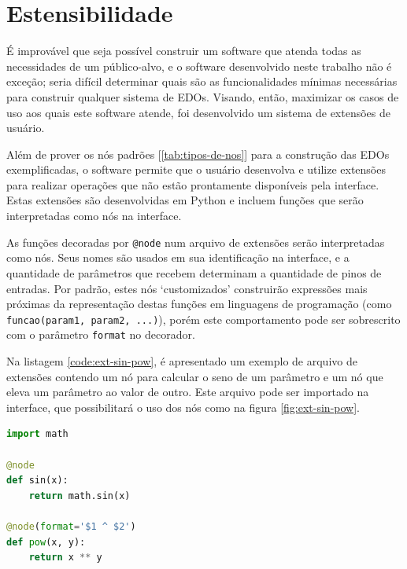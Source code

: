 \documentclass[
	12pt,				%
	openright,			%
	oneside,			%
	a4paper,			%
	main=brazil,
	english,			%
	]{ufsj-abntex2}
\begin{document}
\section{Estensibilidade}
\label{sec:estensibilidade}

É improvável que seja possível construir um software que atenda todas as necessidades de um público-alvo, e o software desenvolvido neste trabalho não é exceção; seria difícil determinar quais são as funcionalidades mínimas necessárias para construir qualquer sistema de EDOs. Visando, então, maximizar os casos de uso aos quais este software atende, foi desenvolvido um sistema de extensões de usuário. 

Além de prover os nós padrões [\ref{tab:tipos-de-nos}] para a construção das EDOs exemplificadas, o software permite que o usuário desenvolva e utilize extensões para realizar operações que não estão prontamente disponíveis pela interface. Estas extensões são desenvolvidas em Python e incluem funções que serão interpretadas como nós na interface.

As funções decoradas por \texttt{@node} num arquivo de extensões serão interpretadas como nós. Seus nomes são usados em sua identificação na interface, e a quantidade de parâmetros que recebem determinam a quantidade de pinos de entradas. Por padrão, estes nós `customizados' construirão expressões mais próximas da representação destas funções em linguagens de programação (como \texttt{funcao(param1, param2, ...)}), porém este comportamento pode ser sobrescrito com o parâmetro \texttt{format} no decorador.

Na listagem \ref{code:ext-sin-pow}, é apresentado um exemplo de arquivo de extensões contendo um nó para calcular o seno de um parâmetro e um nó que eleva um parâmetro ao valor de outro. Este arquivo pode ser importado na interface, que possibilitará o uso dos nós como na figura \ref{fig:ext-sin-pow}.

\begin{lstlisting}[language=Python, label=code:ext-sin-pow, caption=Exemplo de definição dos nós de extensão seno e potência com código Python válido., float, xleftmargin=.35\textwidth]
import math

@node
def sin(x):
    return math.sin(x)

@node(format='$1 ^ $2')
def pow(x, y):
    return x ** y

\end{lstlisting}
\end{document}
